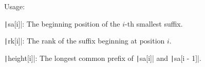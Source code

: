 Usage:
\begin{compactenum}
\item \texttt|sa[i]|: The beginning position of the $i$-th smallest suffix.
\item \texttt|rk[i]|: The rank of the suffix beginning at position $i$.
\item \texttt|height[i]|: The longest common prefix of \texttt|sa[i]| and \texttt|sa[i - 1]|.
\end{compactenum}
\inputminted{cpp}{src/string/suffix/suffix-array.cpp.com}

